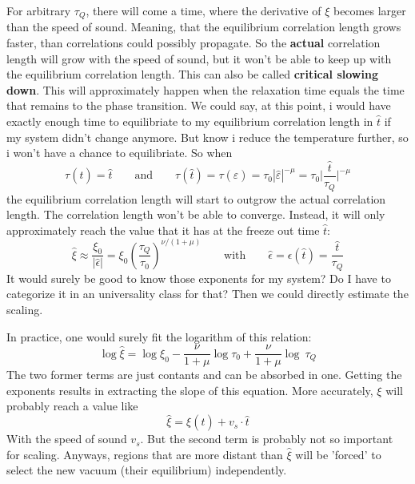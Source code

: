 	For arbitrary $\tau_Q$, there will come a time, where the derivative of $\xi$ becomes larger than the speed of sound. Meaning, that the equilibrium correlation length grows faster, than correlations could possibly propagate. So the \textbf{actual} correlation length will grow with the speed of sound, but it won't be able to keep up with the equilibrium correlation length. This can also be called \textbf{critical slowing down}. This will approximately happen when the relaxation time equals the time that remains to the phase transition. We could say, at this point, i would have exactly enough time to equilibriate to my equilibrium correlation length in $\hat{t}$ if my system didn't change anymore. But know i reduce the temperature further, so i won't have a chance to equilibriate. So when
	\begin{equation}
		\tau(\hat{t}) =	\hat{t} \qquad \text{and} \qquad \tau(\hat{t}) =	\tau(\hat{\varepsilon}) =	\tau_0 |\hat{\varepsilon}|^{-\mu} =	\tau_0 \Big |\frac{\hat{t}}{\tau_Q} \Big |^{-\mu}
	\end{equation}
	the equilibrium correlation length will start to outgrow the actual correlation length. The correlation length won't be able to converge. Instead, it will only approximately reach the value that it has at the freeze out time $\hat{t}$:
	\begin{equation}
		\hat{\xi} \approx \frac{\xi_0}{|\hat{\epsilon}|} =	\xi_0 \left( \frac{\tau_Q}{\tau_0}\right) ^{\nu/(1+\mu)} \qquad \text{with} \qquad \hat{\epsilon} =	\epsilon(\hat{t}) =	\frac{\hat{t}}{\tau_Q}
	\end{equation}
	It would surely be good to know those exponents for my system? Do I have to categorize it in an universality class for that? Then we could directly estimate the scaling.
	
	In practice, one would surely fit the logarithm of this relation:
	\begin{equation}
		\log \hat{\xi} =	\log \xi_0 - \frac{\nu}{1 + \mu} \log \tau_0 + \frac{\nu}{1 + \mu} \log \ \tau_Q
	\end{equation}
	The two former terms are just contants and can be absorbed in one. Getting the exponents results in extracting the slope of this equation.
	More accurately, $\xi$ will probably reach a value like
	\begin{equation}
		\hat{\xi} =	\xi(\hat{t}) + v_s \cdot \hat{t}
	\end{equation}
	With the speed of sound $v_s$. But the second term is probably not so important for scaling. Anyways, regions that are more distant than $\hat{\xi}$ will be 'forced' to select the new vacuum (their equilibrium) independently.
	
